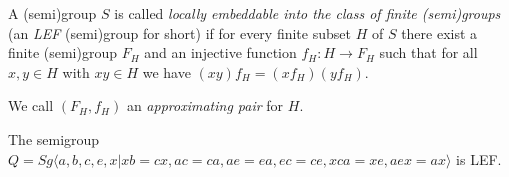 \documentclass[10pt,a4paper]{amsart}
\begin{document}
\begin{definition}\label{def_lef}
A (semi)group $S$ is called {\em locally embeddable into the class of finite (semi)groups} (an {\em LEF} (semi)group  for short) if for every finite subset $H$ of $S$ there exist a finite (semi)group $F_H$ and an injective function $f_H: H \rightarrow F_H$ such that for all  $x,y \in H$ with $xy \in H$ we have $(xy)f_H = (xf_H)(yf_H)$.

We call $(F_H, f_H)$ an {\em approximating pair} for $H$.
\end{definition}

\begin{proposition}
The semigroup $Q = Sg \langle a,b,c,e,x | xb = cx, ac = ca, ae=ea, ec=ce, xca = xe, aex = ax\rangle$ is LEF.
\end{proposition}
\end{document}

